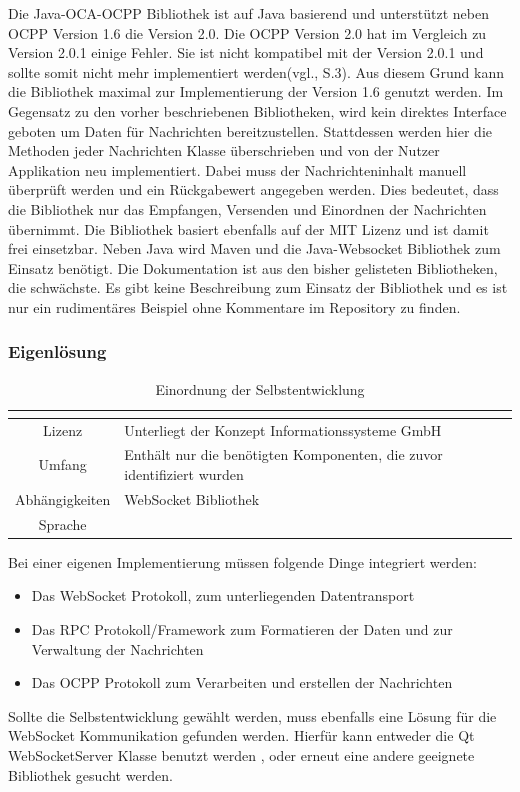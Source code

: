 \noindent Die Java-OCA-OCPP Bibliothek ist auf Java basierend und unterstützt neben OCPP Version 1.6 die Version 2.0. Die OCPP Version 2.0 hat im Vergleich zu Version 2.0.1 einige Fehler. Sie ist nicht kompatibel mit der Version 2.0.1 und sollte somit nicht mehr implementiert werden(vgl.\cite{OCPP-2.0.1-part0-introduction}, S.3). Aus diesem Grund kann die Bibliothek maximal zur Implementierung der Version 1.6 genutzt werden. Im Gegensatz zu den vorher beschriebenen Bibliotheken, wird kein direktes Interface geboten um Daten für Nachrichten bereitzustellen. Stattdessen werden hier die Methoden jeder Nachrichten Klasse überschrieben und von der Nutzer Applikation neu implementiert. Dabei muss der Nachrichteninhalt manuell überprüft werden und ein Rückgabewert angegeben werden. Dies bedeutet, dass die Bibliothek nur das Empfangen, Versenden und Einordnen der Nachrichten übernimmt. Die Bibliothek basiert ebenfalls auf der \acs{MIT} Lizenz und ist damit frei einsetzbar. Neben Java wird Maven und die Java-Websocket Bibliothek zum Einsatz benötigt. Die Dokumentation ist aus den bisher gelisteten Bibliotheken, die schwächste. Es gibt keine Beschreibung zum Einsatz der Bibliothek und es ist nur ein rudimentäres Beispiel ohne Kommentare im Repository zu finden. \\
\subsubsection{Eigenlösung}
\begin{table}[H]
	\begin{tabularx}{\textwidth}{| c | X |}
		\multicolumn{1}{c}{} & \multicolumn{1}{c}{}\\ \hline
		Lizenz & Unterliegt der Konzept Informationssysteme GmbH\newline \\
		Umfang & Enthält nur die benötigten Komponenten, die zuvor identifiziert wurden \newline \\
		Abhängigkeiten & WebSocket Bibliothek\newline \\
		Sprache & \cpp\\ \hline
	\end{tabularx}
	\caption{\label{tab:test_tabelle} Einordnung der Selbstentwicklung \cite{Eigene_Darstellung}}
\end{table}
\noindent Bei einer eigenen Implementierung müssen folgende Dinge integriert werden:
\begin{itemize}
	\item Das WebSocket Protokoll, zum unterliegenden Datentransport
	\item Das RPC Protokoll/Framework zum Formatieren der Daten und zur Verwaltung der Nachrichten
	\item Das OCPP Protokoll zum Verarbeiten und erstellen der Nachrichten
\end{itemize}
Sollte die Selbstentwicklung gewählt werden, muss ebenfalls eine Lösung für die WebSocket Kommunikation gefunden werden. Hierfür kann entweder die Qt WebSocketServer Klasse benutzt werden \cite{QWebsocketServer}, oder erneut eine andere geeignete \cpp Bibliothek gesucht werden. \newline

